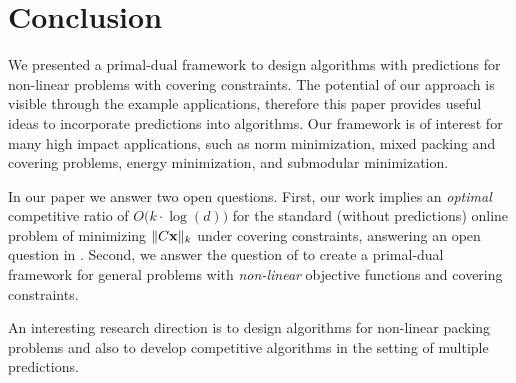 
\section{Conclusion}

We presented a primal-dual framework to design algorithms with predictions for non-linear problems with covering constraints.
The potential of our approach is visible through the example applications, therefore this paper provides useful ideas to incorporate predictions into algorithms.
Our framework is of interest for many high impact applications, such as norm minimization, mixed packing and covering problems, energy minimization, and submodular minimization.

In our paper we answer two open questions.
First, our work implies an \emph{optimal} competitive ratio of $O\bigl( k \cdot \log (d)\bigr)$ for the standard (without predictions) online problem of minimizing $\|C \mathbf{x}\|_{k}$ under covering constraints, answering an open question in \cite{NagarajanShen17:Online-Covering}.
Second, we answer the question of \cite{BamasMaggiori20:The-Primal-Dual-method} to create a primal-dual framework for general problems with \emph{non-linear} objective functions and covering constraints.

An interesting research direction is to design algorithms for non-linear packing problems and also to develop competitive algorithms in the setting of multiple predictions.
